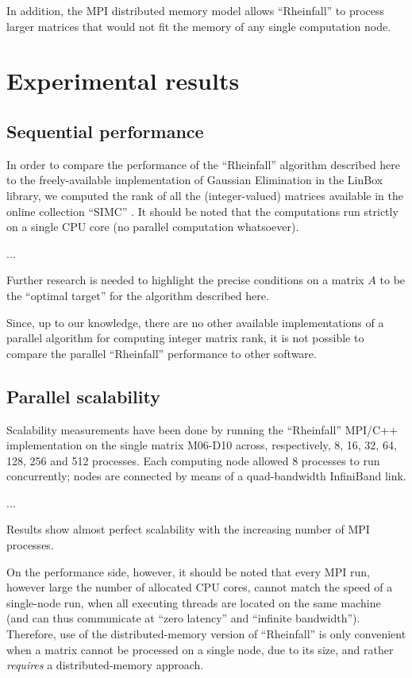 In addition, the MPI distributed memory model allows
``Rheinfall'' to process larger matrices that would not fit the memory
of any single computation node.


\section{Experimental results}
\label{sec:results}

\subsection{Sequential performance}
\label{sec:performance}

In order to compare the performance of the ``Rheinfall'' algorithm
described here to the freely-available implementation of Gaussian
Elimination in the LinBox library, we computed the rank of all the
(integer-valued) matrices available in the online collection ``SIMC''
\cite{simc}.  It should be noted that the computations run strictly on
a single CPU core (no parallel computation whatsoever).

...

Further research is needed to highlight the precise
conditions on a matrix $A$ to be the ``optimal target'' for the
algorithm described here.

Since, up to our knowledge, there are no other available
implementations of a parallel algorithm for computing integer matrix
rank, it is not possible to compare the parallel ``Rheinfall''
performance to other software.

\subsection{Parallel scalability}
\label{sec:scalability}

Scalability measurements have been done by running the ``Rheinfall''
MPI/C++ implementation on the single matrix \textsc{M06-D10} across,
respectively, 8, 16, 32, 64, 128, 256 and 512 processes.  Each
computing node allowed 8 processes to run concurrently; nodes are
connected by means of a quad-bandwidth InfiniBand link.

...

Results show almost perfect scalability with the increasing number of
MPI processes.

On the performance side, however, it should be noted that every MPI
run, however large the number of allocated CPU cores, cannot match the
speed of a single-node run, when all executing threads are located on
the same machine (and can thus communicate at ``zero latency'' and
``infinite bandwidth'').  Therefore, use of the distributed-memory
version of ``Rheinfall'' is only convenient when a matrix cannot be
processed on a single node, due to its size, and rather
\emph{requires} a distributed-memory approach.



